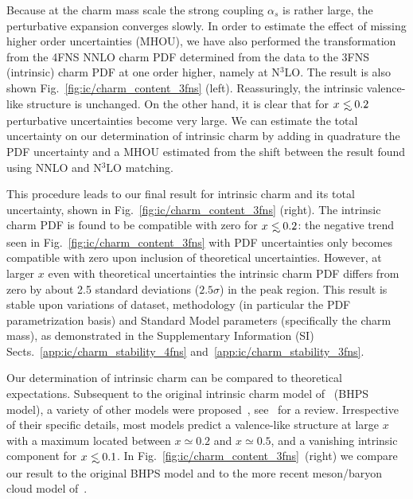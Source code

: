 Because at the charm mass scale the strong coupling $\alpha_s$ is rather
large, the perturbative expansion converges slowly.
%
In order to
estimate the effect of missing higher order uncertainties (MHOU), we
have also performed the transformation from the 4FNS NNLO charm PDF
determined from the data to the 3FNS (intrinsic) charm PDF at one
order higher, namely at N$^3$LO. 
%
The result is also shown
Fig.~\ref{fig:ic/charm_content_3fns} (left). Reassuringly, the intrinsic
valence-like structure is unchanged.
%
On the other hand, it is clear that for
$x\lsim 0.2$ perturbative uncertainties become very large.
%
We can estimate  the total uncertainty on our determination
of intrinsic charm by adding in quadrature the PDF uncertainty and a
MHOU estimated from the shift between the result found using NNLO
and N$^3$LO matching.

This procedure leads to our final result for intrinsic charm and its total
uncertainty, shown in Fig.~\ref{fig:ic/charm_content_3fns} (right).
%
The intrinsic charm PDF is found to be compatible with zero for
$x\lsim 0.2$: the negative trend 
seen  in Fig.~\ref{fig:ic/charm_content_3fns} with PDF uncertainties only 
becomes 
compatible with zero upon inclusion of  theoretical
uncertainties. However, at
larger $x$ even with theoretical uncertainties
the intrinsic charm PDF
 differs 
from zero by about 2.5 standard deviations ($2.5\sigma$) in the peak region.
%
This result  is stable upon variations of dataset, methodology (in
particular the PDF  parametrization basis) and Standard Model
parameters (specifically the charm mass),
as demonstrated in the Supplementary Information (SI) Sects.~\ref{app:ic/charm_stability_4fns}
and~\ref{app:ic/charm_stability_3fns}. 

Our determination of intrinsic charm can be compared to theoretical expectations.
%
Subsequent to the
original intrinsic charm model of~\cite{Brodsky:1980pb} (BHPS
model),
a variety of other models were  
proposed~\cite{Hoffmann:1983ah,Pumplin:2005yf,Paiva:1996dd,Steffens:1999hx,Hobbs:2013bia},
see~\cite{Brodsky:2015fna} for a review.
%
Irrespective of their specific details, most models predict a valence-like
structure at large $x$ 
with a maximum located  between $x\simeq 0.2$ and $x\simeq 0.5$, and a
vanishing intrinsic component for
$x\lsim 0.1$.
%
In Fig.~\ref{fig:ic/charm_content_3fns}~(right) we compare our result to
the original BHPS model and to the more recent meson/baryon cloud model of~\cite{Hobbs:2013bia}.

